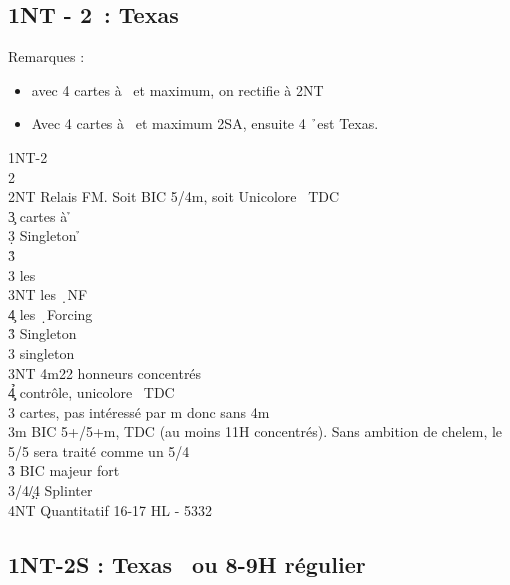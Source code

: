 \documentclass[a4paper]{article}
\begin{document}
\subsection{1NT - 2\pdfh\ : Texas \pdfs}

Remarques :

\begin{itemize}
\item avec 4 cartes à \s\ et maximum, on rectifie à 2NT

\item Avec 4 cartes à \s\ et maximum 2SA, ensuite 4 \h\ est Texas.

\end{itemize}

\begin{bidtable}
1NT-2\h\\
2\s\+\\
2NT \> Relais FM. Soit BIC 5\s /4m, soit Unicolore \s\ TDC\+\\
3\c {} cartes à \h \+\\
3\d \> Singleton \h \+\\
3\h\+\\
3\s \> les \c \\
3NT \> les \d\ NF\\
4\c \> les \d\ Forcing\-\-\\
3\h \> Singleton \c \\
3\s \> singleton \d \\
3NT \s 4m22 honneurs concentrés\\
4\c\d\h \> contrôle, unicolore \s\ TDC\-\\
3\s {} cartes, pas intéressé par m donc sans 4m\-\\
3m \> BIC 5+\s /5+m, TDC (au moins 11H concentrés). Sans ambition de chelem, le 5/5 sera traité comme un 5/4\\
3\h \> BIC majeur fort\\
3\s/4\c/4\d \> Splinter\\
4NT \> Quantitatif 16-17 HL - 5332\-
\end{bidtable}

\subsection{1NT-2S : Texas \pdfc\ ou 8-9H régulier}
\end{document}
